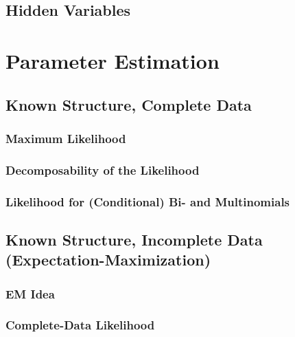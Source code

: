         \subsection{Hidden Variables} %

    \section{Parameter Estimation} %

        \subsection{Known Structure, Complete Data} %

            \subsubsection{Maximum Likelihood} %

            \subsubsection{Decomposability of the Likelihood} %

            \subsubsection{Likelihood for (Conditional) Bi- and Multinomials} %

        \subsection{Known Structure, Incomplete Data (Expectation-Maximization)} %

            \subsubsection{EM Idea} %

            \subsubsection{Complete-Data Likelihood} %

